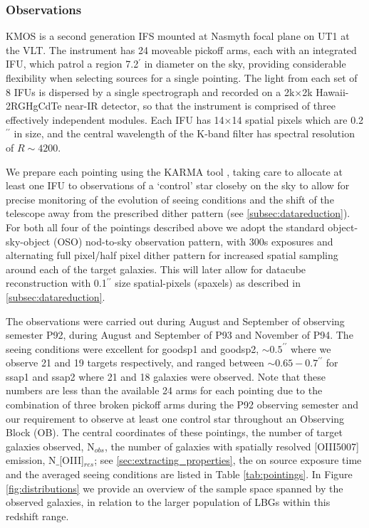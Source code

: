 \documentclass[a4paper,fleqn,usenatbib]{mn2e}
\begin{document}
\subsubsection{Observations}\label{subsub:Obs}
KMOS is a second generation IFS mounted at Nasmyth focal plane on UT1 at the VLT.
The instrument has 24 moveable pickoff arms, each with an integrated IFU, which patrol a region 7.2$^{\prime}$ in diameter on the sky, providing considerable flexibility when selecting sources for a single pointing.
The light from each set of 8 IFUs is dispersed by a single spectrograph and recorded on a 2k$\times$2k Hawaii-2RGHgCdTe near-IR detector, so that the instrument is comprised of three effectively independent modules.
Each IFU has 14$\times$14 spatial pixels which are 0.2$^{\prime\prime}$ in size, and the central wavelength of the K-band filter has spectral resolution of $R \sim 4200$.

We prepare each pointing using the KARMA tool \citep{Wegner2008}, taking care to allocate at least one IFU to observations of a `control' star closeby on the sky to allow for precise monitoring of the evolution of seeing conditions and the shift of the telescope away from the prescribed dither pattern (see \cref{subsec:datareduction}).
For both all four of the pointings described above we adopt the standard object-sky-object (OSO) nod-to-sky observation pattern, with 300s exposures and alternating full pixel/half pixel dither pattern for increased spatial sampling around each of the target galaxies.
This will later allow for datacube reconstruction with 0.1$^{\prime\prime}$ size spatial-pixels (spaxels) as described in \cref{subsec:datareduction}.

The observations were carried out during August and September of observing semester P92, during August and September of P93 and November of P94.
The seeing conditions were excellent for goodsp1 and goodsp2, $\sim 0.5^{\prime\prime}$ where we observe 21 and 19 targets respectively, and ranged between $\sim 0.65-0.7^{\prime\prime}$ for ssap1 and ssap2 where 21 and 18 galaxies were observed.
Note that these numbers are less than the available 24 arms for each pointing due to the combination of three broken pickoff arms during the P92 observing semester and our requirement to observe at least one control star throughout an Observing Block (OB).
The central coordinates of these pointings, the number of target galaxies observed, N$_{obs}$, the number of galaxies with spatially resolved [OIII5007] emission, N$\_$[OIII]$_{res}$; see \cref{sec:extracting_properties}, the on source exposure time and the averaged seeing conditions are listed in Table \ref{tab:pointings}.
In Figure \ref{fig:distributions} we provide an overview of the sample space spanned by the observed galaxies, in relation to the larger population of LBGs within this redshift range. 
\end{document}
